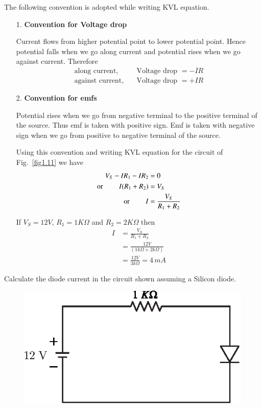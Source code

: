 The following convention is adopted while writing KVL equation. 

\begin{itemize}
\item[{\rm 1.}] \textbf{Convention for Voltage drop}

Current flows from higher potential point to lower potential
point. Hence potential falls when we go along current and potential
rises when we go against current. Therefore
\begin{align*}
\text{along current, } \quad & \text{Voltage drop } = - IR\\
\text{against current,} \quad & \text{Voltage drop } = + IR  
\end{align*}

\item[{\rm 2.}] \textbf{Convention for emfs}

Potential rises when we go from negative terminal to the positive
terminal of the source. Thus emf is taken with positive sign. Emf is
taken with negative  sign when we go from positive to negative
terminal of the source.

Using this convention and writing KVL equation for the circuit of
Fig.~\ref{fig1.11} we have
\begin{align}
V_S - IR_1 - I R_2 & = 0 \notag\\
\text{or } \qquad I (R_1 + R_2) & = V_S  \notag\\
\text{or } \qquad  I & = \frac{V_S}{R_1 + R_2}  \label{eq1.5}
\end{align}

If $V_{S}=12V$, $R_1 = 1 K \Omega$ and $R_2 = 2 K \Omega$ then
\begin{align*}
I &= \frac{V_S}{R_1 + R_2}\\[5pt]
& = \frac{12 V}{(1k \Omega+2k\Omega)}\\[5pt]
& = \frac{12 V}{3
k \Omega} = 4\, m A
\end{align*}
\end{itemize}
 
\begin{example}\label{exam1.8}
Calculate the diode current in the circuit shown assuming a Silicon diode.
\begin{figure}[H]
\centering
\includegraphics{chap1/S3-EE-01-019.eps}
\end{figure}
\end{example}

